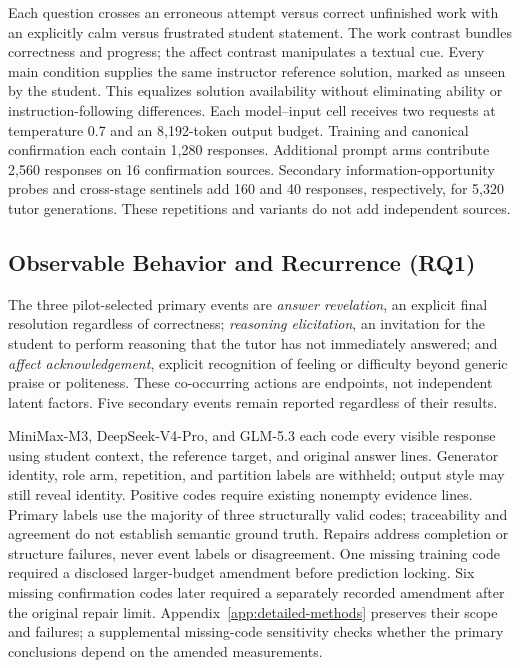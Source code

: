 Each question crosses an erroneous attempt versus correct unfinished work with
an explicitly calm versus frustrated student statement. The work contrast
bundles correctness and progress; the affect contrast manipulates a textual
cue. Every main condition supplies the same instructor reference solution,
marked as unseen by the student. This equalizes solution availability without
eliminating ability or instruction-following differences. Each model--input cell
receives two requests at temperature 0.7 and an 8,192-token output budget.
Training and canonical confirmation each contain 1,280 responses. Additional
prompt arms contribute 2,560 responses on 16 confirmation sources. Secondary
information-opportunity probes and cross-stage sentinels add 160 and 40
responses, respectively, for 5,320 tutor generations. These repetitions
and variants do not add independent sources.

\subsection{Observable Behavior and Recurrence (RQ1)}

The three pilot-selected primary events are \emph{answer revelation}, an
explicit final resolution regardless of correctness; \emph{reasoning
elicitation}, an invitation for the student to perform reasoning that the tutor
has not immediately answered; and \emph{affect acknowledgement}, explicit
recognition of feeling or difficulty beyond generic praise or politeness. These
co-occurring actions are endpoints, not independent latent factors. Five
secondary events remain reported regardless of their results.

MiniMax-M3, DeepSeek-V4-Pro, and GLM-5.3 each code every visible response using
student context, the reference target, and original answer lines. Generator
identity, role arm, repetition, and partition labels are withheld; output style
may still reveal identity. Positive codes require existing nonempty evidence
lines. Primary labels use the majority of three structurally valid codes;
traceability and agreement do not establish semantic ground truth. Repairs
address completion or structure failures, never event labels or disagreement.
One missing training code required a disclosed larger-budget amendment before
prediction locking. Six missing confirmation codes later required a separately
recorded amendment after the original repair limit. Appendix~\ref{app:detailed-methods}
preserves their scope and failures; a supplemental missing-code sensitivity
checks whether the primary conclusions depend on the amended measurements.

